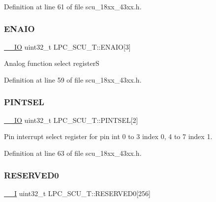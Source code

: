 Definition at line 61 of file scu\+\_\+18xx\+\_\+43xx.\+h.

\mbox{\label{struct_l_p_c___s_c_u___t_a762d35c73a96d6bde03ee84571facab5}} 
\subsubsection{\texorpdfstring{E\+N\+A\+IO}{ENAIO}}
{\footnotesize\ttfamily \hyperlink{core__sc300_8h_aec43007d9998a0a0e01faede4133d6be}{\+\_\+\+\_\+\+IO} uint32\+\_\+t L\+P\+C\+\_\+\+S\+C\+U\+\_\+\+T\+::\+E\+N\+A\+IO\mbox{[}3\mbox{]}}

Analog function select registerS 

Definition at line 59 of file scu\+\_\+18xx\+\_\+43xx.\+h.

\mbox{\label{struct_l_p_c___s_c_u___t_aaa33b2f1501271218162c882373372a7}} 
\subsubsection{\texorpdfstring{P\+I\+N\+T\+S\+EL}{PINTSEL}}
{\footnotesize\ttfamily \hyperlink{core__sc300_8h_aec43007d9998a0a0e01faede4133d6be}{\+\_\+\+\_\+\+IO} uint32\+\_\+t L\+P\+C\+\_\+\+S\+C\+U\+\_\+\+T\+::\+P\+I\+N\+T\+S\+EL\mbox{[}2\mbox{]}}

Pin interrupt select register for pin int 0 to 3 index 0, 4 to 7 index 1. 

Definition at line 63 of file scu\+\_\+18xx\+\_\+43xx.\+h.

\mbox{\label{struct_l_p_c___s_c_u___t_a53225746141a458164eff5932c82ece7}} 
\subsubsection{\texorpdfstring{R\+E\+S\+E\+R\+V\+E\+D0}{RESERVED0}}
{\footnotesize\ttfamily \hyperlink{core__sc300_8h_af63697ed9952cc71e1225efe205f6cd3}{\+\_\+\+\_\+I} uint32\+\_\+t L\+P\+C\+\_\+\+S\+C\+U\+\_\+\+T\+::\+R\+E\+S\+E\+R\+V\+E\+D0\mbox{[}256\mbox{]}}



